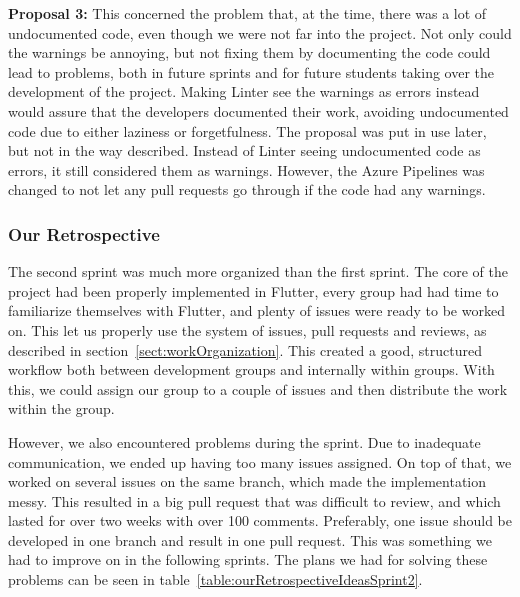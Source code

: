 \textbf{Proposal 3:} This concerned the problem that, at the time, there was a lot of undocumented code, even though we were not far into the project. Not only could the warnings be annoying, but not fixing them by documenting the code could lead to problems, both in future sprints and for future students taking over the development of the project. Making Linter see the warnings as errors instead would assure that the developers documented their work, avoiding undocumented code due to either laziness or forgetfulness.
The proposal was put in use later, but not in the way described. Instead of Linter seeing undocumented code as errors, it still considered them as warnings. However, the Azure Pipelines was changed to not let any pull requests go through if the code had any warnings.

\subsubsection{Our Retrospective}
\label{sect:ourRetrospectiveSprint2}
The second sprint was much more organized than the first sprint. The core of the project had been properly implemented in Flutter, every group had had time to familiarize themselves with Flutter, and plenty of issues were ready to be worked on. This let us properly use the system of issues, pull requests and reviews, as described in section~\ref{sect:workOrganization}. This created a good, structured workflow both between development groups and internally within groups. With this, we could assign our group to a couple of issues and then distribute the work within the group.

However, we also encountered problems during the sprint. Due to inadequate communication, we ended up having too many issues assigned. On top of that, we worked on several issues on the same branch, which made the implementation messy. This resulted in a big pull request that was difficult to review, and which lasted for over two weeks with over 100 comments. Preferably, one issue should be developed in one branch and result in one pull request. This was something we had to improve on in the following sprints. The plans we had for solving these problems can be seen in table~\ref{table:ourRetrospectiveIdeasSprint2}.

